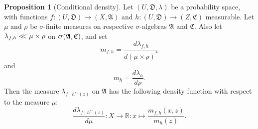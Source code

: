 \documentclass[
twoside=true,
paper=letter,
fontsize=11pt,
pagesize=auto,
leqno,
openany,
headsepline,
overfullrule,
]{scrbook}
\theoremstyle{plain}
\theoremstyle{plain}
\theoremstyle{definition}
\theoremstyle{bfnoteitalic}
\newtheorem{propboldnote}[thm]{Proposition}
\theoremstyle{bfnoteroman}
\newcommand{\sigalg}[1]{\mathfrak{#1}}
\newcommand{\sagb}{\mathop{\hbox{\large{$\sigma$}}}\nolimits}
\newcommand{\textsigma}{\hbox{\large{$\sigma$}}\kern-1pt}
\newcommand{\preimage}[1]{#1^{\leftarrow}}
\newcommand{\R}{\mathbb{R}}
\newcommand{\sigmaalgebra}{\sigalg{A}}
\newcommand{\sigmaalgebraiii}{\sigalg{C}}
\newcommand{\productsig}[2]{\sagb(#1,#2)}
\newcommand{\function}{f}
\newcommand{\functioniii}{h}
\newcommand{\measurespace}{X}
\newcommand{\measurespaceiii}{Z}
\newcommand{\mspaceelt}{x}
\newcommand{\mspaceeltiii}{z}
\newcommand{\abscont}{\mathrel{< \kern-3.5pt <}}
\newcommand{\measure}{\mu}
\newcommand{\measureiii}{\lambda}
\newcommand{\measureiv}{\rho}
\newcommand{\uspace}{U}%
\newcommand{\uspacesig}{\sigalg{D}}
\begin{document}
\begin{propboldnote}[Conditional density]\label{conditional_density}
Let 
$(\uspace, \uspacesig, \measureiii)$ 
be a probability space, with functions
$\function:(\uspace,\uspacesig)\to (\measurespace,\sigmaalgebra)$ 
and
$\functioniii:(\uspace,\uspacesig)\to (\measurespaceiii,\sigmaalgebraiii)$
measurable. 
Let $\measure$ and $\measureiv$ be \textsigma-finite measures on respective \textsigma-algebras
$\sigmaalgebra$ and $\sigmaalgebraiii$.
Also let
$\measureiii_{\function,\functioniii} \abscont \measure\times\measureiv$ on 
$\productsig{\sigmaalgebra}{\sigmaalgebraiii}$, 
and set
\[
m_{\function,\functioniii} 
=
\frac{d \measureiii_{\function,\functioniii}}
{d(\measure\times\measureiv)^*}
\]
and
\[
m_\functioniii
=
\frac{d \measureiii_\functioniii}
{d \measureiv}.
\]
Then the measure
$\measureiii_{\function\mid\preimage{\functioniii}(\mspaceeltiii)}$
on $\sigmaalgebra$ has the following density function with respect to the measure 
$\measure$:
\[
\frac{d \measureiii_{\function\mid\preimage{\functioniii}(\mspaceeltiii)}}{d \measure}
:\measurespace\to\R
:\mspaceelt\mapsto
%
\frac{m_{\function,\functioniii}(\mspaceelt,\mspaceeltiii)}
{m_\functioniii (\mspaceeltiii)}.
\]
\end{propboldnote}
\end{document}

